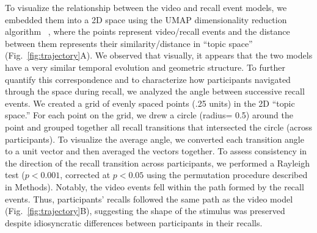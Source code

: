 \documentclass{article}
\begin{document}
To visualize the relationship between the video and recall event models, we embedded them into a 2D space using the UMAP dimensionality reduction algorithm ~\citep{McInHeal18}, where the points represent video/recall events and the distance between them represents their similarity/distance in ``topic space'' (Fig.~\ref{fig:trajectory}A).  We observed that visually, it appears that the two models have a very similar temporal evolution and geometric structure. To further quantify this correspondence and to characterize how participants navigated through the space during recall, we analyzed the angle between successive recall events. We created a grid of evenly spaced points (.25 units) in the 2D ``topic space.'' For each point on the grid, we drew a circle (radius= 0.5) around the point and grouped together all recall transitions that intersected the circle (across participants). To visualize the average angle, we converted each transition angle to a unit vector and then averaged the vectors together. To assess consistency in the direction of the recall transition across participants, we performed a Rayleigh test ($p < 0.001$, corrected at $p < 0.05$ using the permutation procedure described in Methods). Notably, the video events fell within the path formed by the recall events.  Thus, participants' recalls followed the same path as the video model (Fig.~\ref{fig:trajectory}B), suggesting the shape of the stimulus was preserved despite idiosyncratic differences between participants in their recalls.

\end{document}
